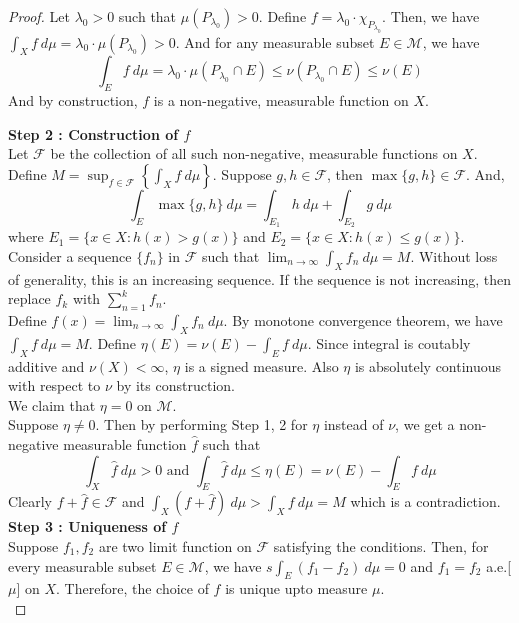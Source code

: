\begin{proof}
	Let $\lambda_0 >0$ such that $\mu(P_{\lambda_0}) > 0$.
	Define $f = \lambda_0 \cdot \chi_{P_{\lambda_0}}$.
	Then, we have $\displaystyle \int_X f \ d\mu = \lambda_0 \cdot \mu(P_{\lambda_0}) > 0$.
	And for any measurable subset $E \in \mathcal{M}$, we have
	\[ \int_E f \ d\mu = \lambda_0 \cdot \mu(P_{\lambda_0} \cap E) \le \nu(P_{\lambda_0} \cap E) \le \nu(E) \]
	And by construction, $f$ is a non-negative, measurable function on $X$.

	\textbf{Step 2 : Construction of $f$}\\
	Let $\mathcal{F}$ be the collection of all such non-negative, measurable functions on $X$.
	Define $\displaystyle M = \sup_{f \in \mathcal{F}} \left\{ \int_X f \ d\mu \right\}$.
	Suppose $g,h \in \mathcal{F}$, then $\max\{g,h\} \in \mathcal{F}$.
	And,
	\[ \int_E \max \{g,h\} \ d\mu = \int_{E_1} h \ d\mu + \int_{E_2} g \ d\mu \]
	where $E_1 = \{ x \in X : h(x) > g(x) \}$ and $E_2 = \{ x \in X : h(x) \le g(x) \}$.\\

	Consider a sequence $\{f_n\}$ in $\mathcal{F}$ such that $\displaystyle \lim_{n \to \infty} \int_X f_n \ d\mu = M$.
	Without loss of generality, this is an increasing sequence.
	If the sequence is not increasing, then replace $f_k$ with $\displaystyle \sum_{n=1}^k f_n$.\\

	Define $\displaystyle f(x) = \lim_{n \to \infty} \int_X f_n \ d\mu$.
	By monotone convergence theorem,  we have $\int_X f \ d\mu = M$.
	Define $\eta(E) = \nu(E) - \int_E f \ d\mu$.
	Since integral is coutably additive and $\nu(X) < \infty$, $\eta$ is a signed measure.
	Also $\eta$ is absolutely continuous with respect to $\nu$ by its construction.\\

	We claim that $\eta = 0$ on $\mathcal{M}$.\\
	Suppose $\eta \ne 0$.
	Then by performing Step 1, 2 for $\eta$ instead of $\nu$, we get a non-negative measurable function $\hat{f}$ such that
	\[ \int_X \hat{f} \ d\mu > 0 \text{ and } \int_E \hat{f} \ d\mu \le \eta(E) = \nu(E) - \int_E f \ d\mu \]
	Clearly $f + \hat{f} \in \mathcal{F}$ and $\displaystyle \int_X (f+\hat{f}) \ d\mu > \int_X f \ d\mu = M$ which is a contradiction.\\

	\textbf{Step 3 : Uniqueness of $f$}\\
	Suppose $f_1,f_2$ are two limit function on $\mathcal{F}$ satisfying the conditions.
	Then, for every measurable subset $E \in \mathcal{M}$, we have $\displaystyle s\int_E (f_1-f_2) \ d\mu = 0$ and $f_1 = f_2$ a.e.[$\mu$] on $X$.
	Therefore, the choice of $f$ is unique upto measure $\mu$.\\


\end{proof}
